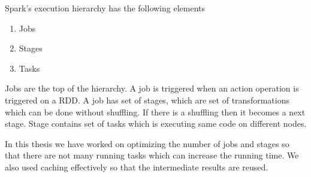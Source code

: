 Spark's execution hierarchy has the following elements
\begin{enumerate}
\item Jobs
\item Stages
\item Tasks
\end{enumerate}

Jobs are the top of the hierarchy. A job is triggered when an action
operation is triggered on a RDD. A job has set of stages, which are
set of transformations which can be done without shuffling. If there
is a shuffling then it becomes a next stage. Stage contains set of
tasks which is executing same code on different nodes.

In this thesis we have worked on optimizing the number of jobs and
stages so that there are not many running tasks which can increase the
running time. We also used caching effectively so that the
intermediate results are reused.


\bigskip

